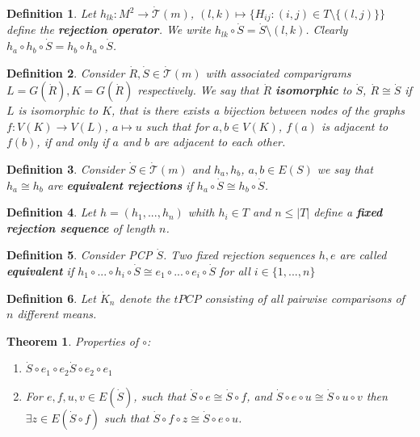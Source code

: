 \documentclass[a4paper,12pt]{article}
\newtheorem{theorem}{Theorem}
\newtheorem{definition}{Definition}
\begin{document}
\begin{definition}
  Let $h_{lk}:  M^2 \rightarrow \dot{\mathcal{T}}(m)$,
  $(l,k) \mapsto \{H_{ij}: (i,j) \in T\setminus \{(l,j)\}\}$ define the
  {\bf rejection operator}. We write $h_{lk} \circ \dot{S} =
  \dot{S}\setminus (l,k)$. Clearly   $h_{a} \circ h_{b} \circ \dot{S}
  = h_{b} \circ h_{a} \circ \dot{S}$.
\end{definition}

\begin{definition}
  Consider $\dot{R},\dot{S} \in \dot{\mathcal{T}}(m)$ with associated
  comparigrams $L = G(\dot{R}), K = G(\dot{R})$ respectively. We say
  that $\dot{R}$ {\bf isomorphic} to $\dot{S}$, $\dot{R} \cong
  \dot{S}$ if $L$ is isomorphic to $K$, that is there exists a
  bijection between nodes of the graphs $f:V(K) \rightarrow V(L)$, $a
  \mapsto u$ such that for $a,b \in V(K)$, $f(a)$ is adjacent to
  $f(b)$, if and only if $a$ and $b$ are adjacent to each other.
\end{definition}

\begin{definition}
  Consider $\dot{S} \in \dot{\mathcal{T}}(m)$ and $h_a,h_b$, $a,b \in
  E(S)$ we say that $h_a \cong h_b$ are {\bf equivalent rejections} if $h_a
  \circ \dot{S} \cong h_b \circ \dot{S}$.
\end{definition}

\begin{definition}
  Let $h = (h_1,...,h_n)$ whith $h_i \in T$ and $n \leq |T|$ define a
  {\bf fixed rejection sequence} of length $n$.
\end{definition}

\begin{definition}
  Consider PCP $\dot{S}$. Two fixed rejection sequences $h, e$ are
  called {\bf equivalent} if $h_1\circ ... \circ h_i \circ \dot{S} \cong e_1 \circ
  ... \circ e_i \circ \dot{S}$ for all   $i \in \{1,...,n\}$
\end{definition}
\begin{definition}
  Let $\dot{K}_n$ denote the $tPCP$ consisting of all pairwise
  comparisons of $n$ different means.
\end{definition}

\begin{theorem}
  Properties of $\circ$:
  \begin{enumerate}
    \item $\dot{S} \circ e_1 \circ e_2 \dot{S} \circ e_2 \circ e_1$
    \item For $e,f,u,v \in E(\dot{S})$, such that $\dot{S} \circ e
      \cong \dot{S} \circ f$, and $\dot{S} \circ e \circ u \cong
      \dot{S} \circ u \circ v$ then $\exists z \in E(\dot{S} \circ f)$
      such that $\dot{S} \circ f \circ z \cong \dot{S} \circ e \circ
      u$. 
  \end{enumerate}
\end{theorem}
\end{document}
